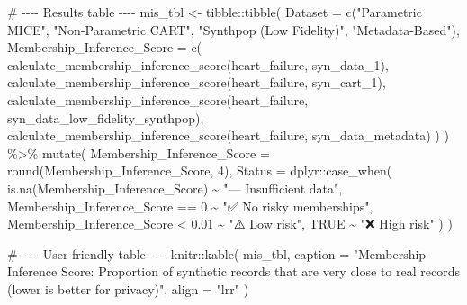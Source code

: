 \documentclass[
  letterpaper,
  DIV=11,
  numbers=noendperiod]{scrartcl}
\newenvironment{Shaded}{\begin{snugshade}}{\end{snugshade}}
\newcommand{\AttributeTok}[1]{\textcolor[rgb]{0.40,0.45,0.13}{#1}}
\newcommand{\CommentTok}[1]{\textcolor[rgb]{0.37,0.37,0.37}{#1}}
\newcommand{\ConstantTok}[1]{\textcolor[rgb]{0.56,0.35,0.01}{#1}}
\newcommand{\DecValTok}[1]{\textcolor[rgb]{0.68,0.00,0.00}{#1}}
\newcommand{\FloatTok}[1]{\textcolor[rgb]{0.68,0.00,0.00}{#1}}
\newcommand{\FunctionTok}[1]{\textcolor[rgb]{0.28,0.35,0.67}{#1}}
\newcommand{\NormalTok}[1]{\textcolor[rgb]{0.00,0.23,0.31}{#1}}
\newcommand{\OtherTok}[1]{\textcolor[rgb]{0.00,0.23,0.31}{#1}}
\newcommand{\SpecialCharTok}[1]{\textcolor[rgb]{0.37,0.37,0.37}{#1}}
\newcommand{\StringTok}[1]{\textcolor[rgb]{0.13,0.47,0.30}{#1}}
\begin{document}
\begin{Shaded}
\begin{Highlighting}[]
\CommentTok{\# {-}{-}{-}{-} Results table {-}{-}{-}{-}}
\NormalTok{mis\_tbl }\OtherTok{\textless{}{-}}\NormalTok{ tibble}\SpecialCharTok{::}\FunctionTok{tibble}\NormalTok{(}
  \AttributeTok{Dataset =} \FunctionTok{c}\NormalTok{(}\StringTok{"Parametric MICE"}\NormalTok{, }\StringTok{"Non{-}Parametric CART"}\NormalTok{,}
              \StringTok{"Synthpop (Low Fidelity)"}\NormalTok{, }\StringTok{"Metadata{-}Based"}\NormalTok{),}
  \AttributeTok{Membership\_Inference\_Score =} \FunctionTok{c}\NormalTok{(}
    \FunctionTok{calculate\_membership\_inference\_score}\NormalTok{(heart\_failure, syn\_data\_1),}
    \FunctionTok{calculate\_membership\_inference\_score}\NormalTok{(heart\_failure, syn\_cart\_1),}
    \FunctionTok{calculate\_membership\_inference\_score}\NormalTok{(heart\_failure, syn\_data\_low\_fidelity\_synthpop),}
    \FunctionTok{calculate\_membership\_inference\_score}\NormalTok{(heart\_failure, syn\_data\_metadata)}
\NormalTok{  )}
\NormalTok{) }\SpecialCharTok{\%\textgreater{}\%}
  \FunctionTok{mutate}\NormalTok{(}
    \AttributeTok{Membership\_Inference\_Score =} \FunctionTok{round}\NormalTok{(Membership\_Inference\_Score, }\DecValTok{4}\NormalTok{),}
    \AttributeTok{Status =}\NormalTok{ dplyr}\SpecialCharTok{::}\FunctionTok{case\_when}\NormalTok{(}
      \FunctionTok{is.na}\NormalTok{(Membership\_Inference\_Score)              }\SpecialCharTok{\textasciitilde{}} \StringTok{"— Insufficient data"}\NormalTok{,}
\NormalTok{      Membership\_Inference\_Score }\SpecialCharTok{==} \DecValTok{0}                \SpecialCharTok{\textasciitilde{}} \StringTok{"✅ No risky memberships"}\NormalTok{,}
\NormalTok{      Membership\_Inference\_Score }\SpecialCharTok{\textless{}} \FloatTok{0.01}              \SpecialCharTok{\textasciitilde{}} \StringTok{"⚠️ Low risk"}\NormalTok{,}
      \ConstantTok{TRUE}                                           \SpecialCharTok{\textasciitilde{}} \StringTok{"❌ High risk"}
\NormalTok{    )}
\NormalTok{  )}

\CommentTok{\# {-}{-}{-}{-} User{-}friendly table {-}{-}{-}{-}}
\NormalTok{knitr}\SpecialCharTok{::}\FunctionTok{kable}\NormalTok{(}
\NormalTok{  mis\_tbl,}
  \AttributeTok{caption =} \StringTok{"Membership Inference Score: Proportion of synthetic records that are very close to real records (lower is better for privacy)"}\NormalTok{,}
  \AttributeTok{align   =} \StringTok{"lrr"}
\NormalTok{)}
\end{Highlighting}
\end{Shaded}
\end{document}
